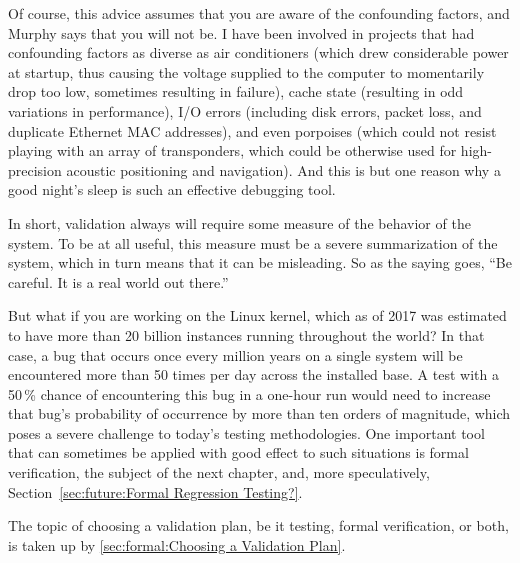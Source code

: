 Of course, this advice assumes that you are aware of the confounding
factors, and Murphy says that you will not be.
I have been involved in projects that had confounding factors as diverse
as air conditioners (which drew considerable power at startup, thus
causing the voltage supplied to the computer to momentarily drop too
low, sometimes resulting in failure), cache state (resulting in odd
variations in performance), I/O errors (including disk errors, packet
loss, and duplicate Ethernet MAC addresses), and even porpoises (which
could not resist playing with an array of transponders, which could be
otherwise used for high-precision acoustic positioning and navigation).
And this is but one reason why a good night's sleep is such an effective
debugging tool.

In short, validation always will require some measure of the behavior of
the system.
To be at all useful, this measure must be a severe summarization of the
system, which in turn means that it can be misleading.
So as the saying goes, ``Be careful.  It is a real world out there.''

But what if you are working on the Linux kernel, which as of 2017 was
estimated to have more than 20 billion instances running throughout
the world?
In that case, a bug that occurs once every million years on a single system
will be encountered more than 50 times per day across the installed base.
A test with a 50\,\% chance of encountering this bug in a one-hour run
would need to increase that bug's probability of occurrence by more than
ten orders of magnitude, which poses a severe challenge to
today's testing methodologies.
One important tool that can sometimes be applied with good effect to
such situations is formal verification, the subject of the next chapter,
and, more speculatively, Section~\ref{sec:future:Formal Regression Testing?}.

The topic of choosing a validation plan, be it testing, formal
verification, or both, is taken up by
\cref{sec:formal:Choosing a Validation Plan}.


